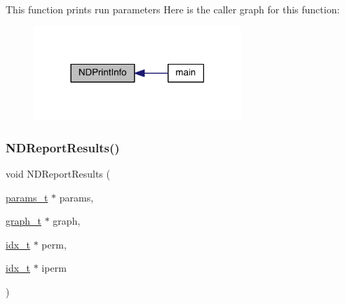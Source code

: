 This function prints run parameters Here is the caller graph for this function\+:\nopagebreak
\begin{figure}[H]
\begin{center}
\leavevmode
\includegraphics[width=222pt]{a00326_aef57dff33874ea99e9584665424dbf22_icgraph}
\end{center}
\end{figure}
\mbox{\label{a00326_ae474b9ac69c59e61afcdd45e4c2913f0}} 
\subsubsection{\texorpdfstring{N\+D\+Report\+Results()}{NDReportResults()}}
{\footnotesize\ttfamily void N\+D\+Report\+Results (\begin{DoxyParamCaption}\item[{\hyperlink{a00706}{params\+\_\+t} $\ast$}]{params,  }\item[{\hyperlink{a00734}{graph\+\_\+t} $\ast$}]{graph,  }\item[{\hyperlink{a00876_aaa5262be3e700770163401acb0150f52}{idx\+\_\+t} $\ast$}]{perm,  }\item[{\hyperlink{a00876_aaa5262be3e700770163401acb0150f52}{idx\+\_\+t} $\ast$}]{iperm }\end{DoxyParamCaption})}

